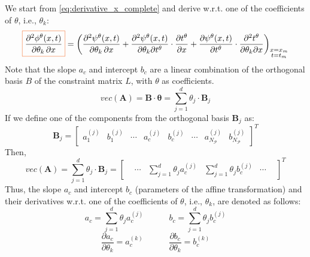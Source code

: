 We start from \cref{eq:derivative_x_complete} and derive w.r.t. one of the coefficients of $\theta$, i.e., $\theta_k$:
\begin{equation}
  \color{Orange}\boxed{\color{black}\frac{\partial^2 \phi^\theta(x,t)}{\partial \theta_k \, \partial x}}\color{black} = 
  \bigg(
  \frac{\partial^2 \psi^\theta(x,t)}{\partial \theta_k \, \partial x} + 
  \frac{\partial^2 \psi^\theta(x,t)}{\partial \theta_k \partial t^\theta} \cdot
  \frac{\partial t^\theta}{\partial x} + 
  \frac{\partial \psi^\theta(x,t)}{\partial t^\theta} \cdot
  \frac{\partial^2 t^\theta}{\partial \theta_k \partial x}
  \bigg)_{\substack{x = x_m \\ t = t_m}}
\end{equation}
Note that the slope $a_c$ and intercept $b_c$ are a linear combination of the orthogonal basis $B$ of the constraint matrix $L$, with $\theta$ as coefficients. 
\begin{equation}\label{eq:vec_A:repeat}
vec(\textbf{A}) = \textbf{B} \cdot \boldsymbol{\theta} = \sum_{j=1}^{d} \theta_j \cdot \textbf{B}_j
\end{equation}
If we define one of the components from the orthogonal basis $\textbf{B}_j$ as:
\begin{equation}\label{eq:basis:repeat}
\textbf{B}_{j} = \begin{bmatrix} a_1^{(j)} & b_1^{(j)} & \cdots & a_c^{(j)} & b_c^{(j)} & \cdots & a_{N_\mathcal{P}}^{(j)} & b_{N_\mathcal{P}}^{(j)}\end{bmatrix}^T
\end{equation}
Then,
\begin{equation}\label{eq:vec_A_complete:repeat}
vec(\textbf{A}) = \sum_{j=1}^{d} \theta_j \cdot \textbf{B}_j = \begin{bmatrix} & \cdots & \sum_{j=1}^{d} \theta_j a_c^{(j)} & \sum_{j=1}^{d} \theta_j b_c^{(j)} & \cdots & \end{bmatrix}^T
\end{equation}
Thus, the slope $a_c$ and intercept $b_c$ (parameters of the affine transformation) and their derivatives w.r.t. one of the coefficients of $\theta$, i.e., $\theta_k$, are denoted as follows:
\begin{equation}\label{eq:ac_bc:repeat}
a_c = \sum_{j=1}^{d} \theta_j a_c^{(j)} \quad\quad\quad
b_c = \sum_{j=1}^{d} \theta_j b_c^{(j)}
\end{equation}
\begin{equation}\label{eq:ac_bc_partial}
  \frac{\partial a_c}{\partial \theta_k} = a_c^{(k)} \quad\quad\quad
  \frac{\partial b_c}{\partial \theta_k} = b_c^{(k)}
  \end{equation}

